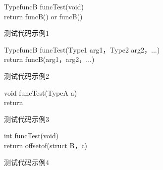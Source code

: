 \begin{minipage}{0.45\textwidth}
  \begin{algorithm}[H]
    \SetAlgoLined
    TypefuncB funcTest(void){\\
      return funcB()\;
        or \;
      funcB()\;
    }
    \caption{测试代码示例1}
    \label{algo:algorithm2}
  \end{algorithm}
\end{minipage}
\hfill
\begin{minipage}{0.45\textwidth}
  \begin{algorithm}[H]
    \SetAlgoLined
    TypefuncB funcTest(Type1 arg1，Type2 arg2，...){\\
      return funcB(arg1，arg2，...)\;
    }
    \caption{测试代码示例2}
    \label{algo:algorithm3}
  \end{algorithm}
\end{minipage}

\begin{minipage}{0.45\textwidth}
  \begin{algorithm}[H]
    \SetAlgoLined
    void funcTest(TypeA a){\\
      return \;
    }
    \caption{测试代码示例3}
    \label{algo:algorithm4}
  \end{algorithm}
\end{minipage}
\hfill
\begin{minipage}{0.45\textwidth}
  \begin{algorithm}[H]
    \SetAlgoLined
    int funcTest(void){\\
      return offsetof(struct B，c) \;
    }
    \caption{测试代码示例4}
    \label{algo:algorithm5}
  \end{algorithm}
\end{minipage}





